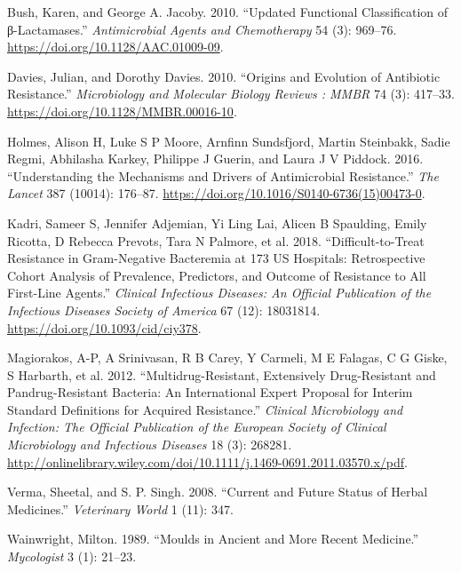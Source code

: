 \documentclass[
  letterpaper,
  DIV=11,
  numbers=noendperiod]{scrreprt}
\newlength{\cslhangindent}
\newlength{\cslentryspacingunit} %
\newenvironment{CSLReferences}[2] %
 {%
  \setlength{\parindent}{0pt}
  \ifodd #1
  \let\oldpar\par
  \def\par{\hangindent=\cslhangindent\oldpar}
  \fi
  \setlength{\parskip}{#2\cslentryspacingunit}
 }%
 {}
\begin{document}
\hypertarget{refs}{}
\begin{CSLReferences}{1}{0}
\leavevmode{}%
Bush, Karen, and George A. Jacoby. 2010. {``Updated Functional
Classification of β-Lactamases.''} \emph{Antimicrobial Agents and
Chemotherapy} 54 (3): 969--76.
\url{https://doi.org/10.1128/AAC.01009-09}.

\leavevmode{}%
Davies, Julian, and Dorothy Davies. 2010. {``Origins and {Evolution} of
{Antibiotic Resistance}.''} \emph{Microbiology and Molecular Biology
Reviews : MMBR} 74 (3): 417--33.
\url{https://doi.org/10.1128/MMBR.00016-10}.

\leavevmode{}%
Holmes, Alison H, Luke S P Moore, Arnfinn Sundsfjord, Martin Steinbakk,
Sadie Regmi, Abhilasha Karkey, Philippe J Guerin, and Laura J V Piddock.
2016. {``Understanding the Mechanisms and Drivers of Antimicrobial
Resistance.''} \emph{The Lancet} 387 (10014): 176--87.
\url{https://doi.org/10.1016/S0140-6736(15)00473-0}.

\leavevmode{}%
Kadri, Sameer S, Jennifer Adjemian, Yi Ling Lai, Alicen B Spaulding,
Emily Ricotta, D Rebecca Prevots, Tara N Palmore, et al. 2018.
{``Difficult-to-Treat Resistance in Gram-Negative Bacteremia at 173 US
Hospitals: Retrospective Cohort Analysis of Prevalence, Predictors, and
Outcome of Resistance to All First-Line Agents.''} \emph{Clinical
Infectious Diseases: An Official Publication of the Infectious Diseases
Society of America} 67 (12): 18031814.
\url{https://doi.org/10.1093/cid/ciy378}.

\leavevmode{}%
Magiorakos, A-P, A Srinivasan, R B Carey, Y Carmeli, M E Falagas, C G
Giske, S Harbarth, et al. 2012. {``Multidrug-Resistant, Extensively
Drug-Resistant and Pandrug-Resistant Bacteria: An International Expert
Proposal for Interim Standard Definitions for Acquired Resistance.''}
\emph{Clinical Microbiology and Infection: The Official Publication of
the European Society of Clinical Microbiology and Infectious Diseases}
18 (3): 268281.
\url{http://onlinelibrary.wiley.com/doi/10.1111/j.1469-0691.2011.03570.x/pdf}.

\leavevmode{}%
Verma, Sheetal, and S. P. Singh. 2008. {``Current and Future Status of
Herbal Medicines.''} \emph{Veterinary World} 1 (11): 347.

\leavevmode{}%
Wainwright, Milton. 1989. {``Moulds in Ancient and More Recent
Medicine.''} \emph{Mycologist} 3 (1): 21--23.

\end{CSLReferences}
\end{document}
